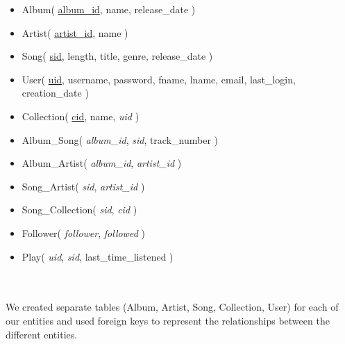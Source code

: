 \documentclass[12pt]{article}
\begin{document}
    \begin{itemize}
        \item Album( \underline{album\_id}, name, release\_date )
        \item Artist( \underline{artist\_id}, name )
        \item Song( \underline{sid}, length, title, genre, release\_date )
        \item User( \underline{uid}, username, password, fname, lname, email, last\_login, creation\_date )
        \item Collection( \underline{cid}, name, \emph{uid} )
        \item Album\_Song( \emph{album\_id}, \emph{sid}, track\_number )
        \item Album\_Artist( \emph{album\_id}, \emph{artist\_id} )
        \item Song\_Artist( \emph{sid}, \emph{artist\_id} )
        \item Song\_Collection( \emph{sid}, \emph{cid} )
        \item Follower( \emph{follower}, \emph{followed} )
        \item Play( \emph{uid}, \emph{sid}, last\_time\_listened )
    \end{itemize}
    \\~\\
    We created separate tables (Album, Artist, Song, Collection, User) for each of our
    entities and used foreign keys to represent the relationships between the different entities.
\end{document}
